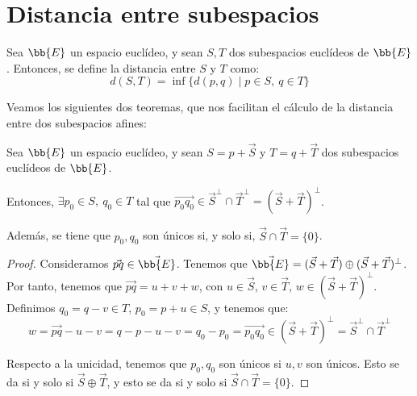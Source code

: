 \section{Distancia entre subespacios}
\begin{definicion}
    Sea $\bb{E}$ un espacio euclídeo, y sean $S,T$ dos subespacios euclídeos de $\bb{E}$. Entonces, se define la distancia entre $S$ y $T$ como:
    \begin{equation*}
        d(S,T) = \inf\{d(p,q)\mid p\in S,~q\in T\}
    \end{equation*}
\end{definicion}

Veamos los siguientes dos teoremas, que nos facilitan el cálculo de la distancia entre dos subespacios afines:
\begin{teo}\label{teo:existencia_vector_ortogonal}
    Sea $\bb{E}$ un espacio euclídeo, y sean $S=p+\vec{S}$ y $T=q+\vec{T}$ dos subespacios euclídeos de $\bb{E}$.

    Entonces, $\exists p_0\in S,~ q_0\in T$ tal que $\vec{p_0q_0}\in \vec{S}^\perp\cap \vec{T}^\perp = (\vec{S} + \vec{T})^\perp$.


    Además, se tiene que $p_0,q_0$ son únicos si, y solo si, $\vec{S}\cap \vec{T}=\{0\}$.
\end{teo}
\begin{proof}
    Consideramos $\vec{pq}\in \vec{\bb{E}}$. Tenemos que $\vec{\bb{E}}=(\vec{S}+\vec{T}) \oplus (\vec{S}+\vec{T})^\perp$. Por tanto, tenemos que $\vec{pq}=u+v+w$, con $u\in \vec{S}$, $v\in \vec{T}$, $w\in (\vec{S}+\vec{T})^\perp$. Definimos $q_0=q-v\in T$, $p_0= p+u\in S$, y tenemos que:
    \begin{equation*}
        w = \vec{pq} - u -v = q-p-u-v=q_0-p_0=\vec{p_0q_0} \in (\vec{S} + \vec{T})^\perp = \vec{S}^\perp\cap \vec{T}^\perp
    \end{equation*}

    Respecto a la unicidad, tenemos que $p_0, q_0$ son únicos si $u,v$ son únicos. Esto se da si y solo si $\vec{S}\oplus \vec{T}$, y esto se da si y solo si $\vec{S}\cap \vec{T}=\{0\}$.
\end{proof}

